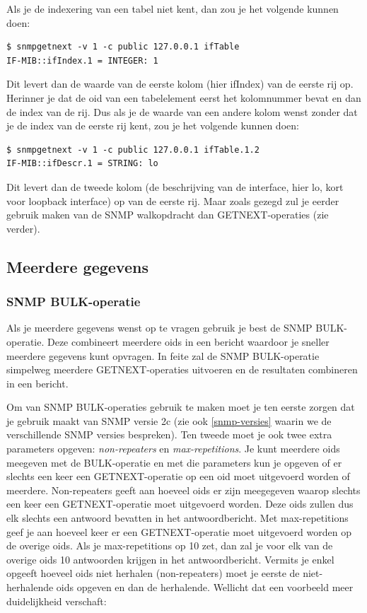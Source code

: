Als je de indexering van een tabel niet kent, dan zou je het volgende kunnen doen:

\begin{lstlisting}[float=h, caption={SNMP GETNEXT-opdracht op een tabel}, label=netsnmp-getnext]
$ snmpgetnext -v 1 -c public 127.0.0.1 ifTable
IF-MIB::ifIndex.1 = INTEGER: 1
\end{lstlisting}

Dit levert dan de waarde van de eerste kolom (hier ifIndex) van de eerste rij op.
Herinner je dat de \gls{oid} van een tabelelement eerst het kolomnummer bevat en dan de index van de rij.
Dus als je de waarde van een andere kolom wenst zonder dat je de index van de eerste rij kent, zou je het volgende kunnen doen:

\begin{lstlisting}[float=h, caption={SNMP GETNEXT-opdracht op een kolom van een tabel}, label=netsnmp-getnextcol]
$ snmpgetnext -v 1 -c public 127.0.0.1 ifTable.1.2
IF-MIB::ifDescr.1 = STRING: lo
\end{lstlisting}

Dit levert dan de tweede kolom (de beschrijving van de interface, hier lo, kort voor loopback interface) op van de eerste rij.
Maar zoals gezegd zul je eerder gebruik maken van de SNMP walkopdracht dan GETNEXT-operaties (zie verder).


\subsection{Meerdere gegevens}

\subsubsection{SNMP BULK-operatie}
Als je meerdere gegevens wenst op te vragen gebruik je best de SNMP BULK-operatie.
Deze combineert meerdere \glspl{oid} in een bericht waardoor je sneller meerdere gegevens kunt opvragen.
In feite zal de SNMP BULK-operatie simpelweg meerdere GETNEXT-operaties uitvoeren en de resultaten combineren in een bericht.

Om van SNMP BULK-operaties gebruik te maken moet je ten eerste zorgen dat je gebruik maakt van SNMP versie 2c
(zie ook \cref{snmp-versies} waarin we de verschillende SNMP versies bespreken).
Ten tweede moet je ook twee extra parameters opgeven: \textit{non-repeaters} en \textit{max-repetitions}.
Je kunt meerdere \glspl{oid} meegeven met de BULK-operatie en met die parameters kun je opgeven of er slechts een keer
een GETNEXT-operatie op een \gls{oid} moet uitgevoerd worden of meerdere.
Non-repeaters geeft aan hoeveel \glspl{oid} er zijn meegegeven waarop slechts een keer een GETNEXT-operatie moet uitgevoerd worden.
Deze \glspl{oid} zullen dus elk slechts een antwoord bevatten in het antwoordbericht.
Met max-repetitions geef je aan hoeveel keer er een GETNEXT-operatie moet uitgevoerd worden op de overige \glspl{oid}.
Als je max-repetitions op 10 zet, dan zal je voor elk van de overige \glspl{oid} 10 antwoorden krijgen in het antwoordbericht.
Vermits je enkel opgeeft hoeveel \glspl{oid} niet herhalen (non-repeaters) moet je eerste de niet-herhalende \glspl{oid} opgeven en dan de herhalende.
Wellicht dat een voorbeeld meer duidelijkheid verschaft:

